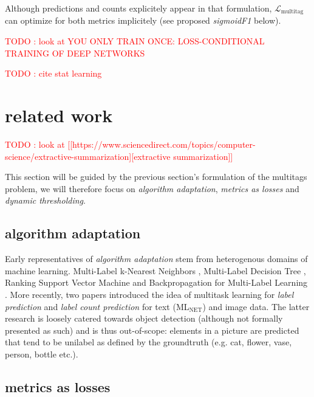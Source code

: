 \documentclass[sigconf,natbib,screen=true,review=true,anonymous]{acmart}
\newcommand\todo[1]{\textcolor{red}{TODO : #1}}
\begin{document}
Although predictions and counts explicitely appear in that formulation, \(\mathcal{L}_{\text {multitag}}\) can optimize for both metrics implicitely (see proposed \emph{sigmoidF1} below).


\todo{look at YOU ONLY TRAIN ONCE: LOSS-CONDITIONAL TRAINING OF DEEP NETWORKS}

\todo{cite stat learning}   \cite[p. 308-310]{statLearning}




\section{related work}
\label{sec:orgea8104b}

\todo{look at [[https://www.sciencedirect.com/topics/computer-science/extractive-summarization][extractive summarization]]}

This section will be guided by the previous section's formulation of the multitags problem, we will therefore focus on \emph{algorithm adaptation}, \emph{metrics as losses} and \emph{dynamic thresholding}.

\subsection{algorithm adaptation}
\label{sec:org2a049cc}

Early representatives of \emph{algorithm adaptation} stem from heterogenous domains of machine learning. Multi-Label k-Nearest Neighbors \cite{ML-KNN}, Multi-Label Decision Tree \cite{ML-DT}, Ranking Support Vector Machine \cite{multilabelSVM} and Backpropagation for Multi-Label Learning \cite{multilabelBackprop}. More recently, two papers introduced the idea of multitask learning for \emph{label prediction} and \emph{label count prediction} for text (ML\(_{\text{NET}}\)) \cite{multitaskLabel} and image \cite{multitaskLabelImages} data. The latter research is loosely catered towards object detection (although not formally presented as such) and is thus out-of-scope: elements in a picture are predicted that tend to be unilabel as defined by the groundtruth (e.g. cat, flower, vase, person, bottle etc.).

\subsection{metrics as losses}
\label{sec:org07bc863}
\end{document}
